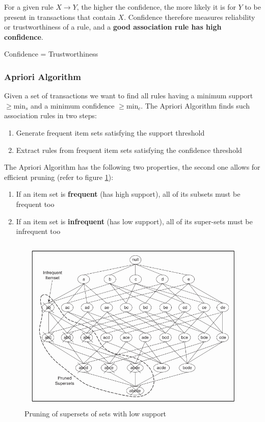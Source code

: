 \documentclass[11pt]{article}
\begin{document}
For a given rule $X \rightarrow Y$, the higher the confidence, the more likely it is for $Y$ to be present in transactions that contain $X$. Confidence therefore measures reliability or trustworthiness of a rule, and a \textbf{good association rule has high confidence}.

\begin{theorem}
    Confidence = Trustworthiness
\end{theorem}

\subsubsection{Apriori Algorithm}

Given a set of transactions we want to find all rules having a minimum support $\geq \text{min}_s$ and a minimum confidence $\geq \text{min}_c$. The Apriori Algorithm finds such association rules in two steps:
\begin{enumerate}
    \item Generate frequent item sets satisfying the support threshold
    \item Extract rules from frequent item sets satisfying the confidence threshold
\end{enumerate}

The Apriori Algorithm has the following two properties, the second one allows for efficient pruning (refer to figure \ref{fig:supersetpruning}):

\begin{enumerate}
    \item If an item set is \textbf{frequent} (has high support), all of its subsets must be frequent too
    \item If an item set is \textbf{infrequent} (has low support), all of its super-sets must be infrequent too
\end{enumerate}

\begin{figure}[tbh!]
    \centering
    \includegraphics[width=0.5\linewidth, keepaspectratio]{Pictures/superset_pruning}
    \caption{Pruning of supersets of sets with low support}
    \label{fig:supersetpruning}
\end{figure}
\end{document}
